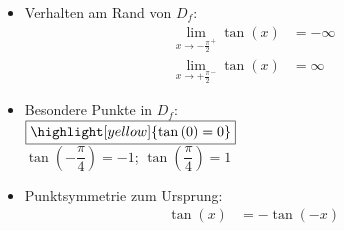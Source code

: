 \begin{minipage}[t]{0.45\linewidth}
\begin{itemize}[leftmargin=*]
{{
            }\\[2.0ex]
            $D_{f} = \left] \ -\dfrac{\pi}{2}; +\dfrac{\pi}{2} \ \right[$; \qquad $W_{f} = \mathbb{R}$\\[2.0ex]
            senkrechte Asymptoten:\\[1.5ex]
            $x = - \dfrac{\pi}{2}$; \qquad $x = \dfrac{\pi}{2}$\\[-2.0ex]
            }
        \item Verhalten am Rand von $D_{f}$:\\[-1.0ex]{
            \vspace{-2.0ex}
            \begin{align*}
                \lim\limits_{x \to -\frac{\pi}{2}^{+}} \tan\left(x\right) &= - \infty &&\\[1.5ex]
                \lim\limits_{x \to +\frac{\pi}{2}^{-}} \tan\left(x\right) &= \infty &&
            \end{align*}
            }
        \item Besondere Punkte in $D_{f}$:\\{
            $\boxed{\highlight[yellow]{\tan\left(0\right) = 0}}$\\[1.0ex]
            $\tan\left(-\dfrac{\pi}{4}\right) = -1$; \qquad $\tan\left(\dfrac{\pi}{4}\right) = 1$
        }
        \item Punktsymmetrie zum Ursprung: \\[-1.0ex]{
            \vspace{-2.0ex}
            \begin{align*}
                \tan\left(x\right) &= -\tan\left(-x\right) &&
            \end{align*}
            }
    \end{itemize}
\end{minipage}
\hfill
